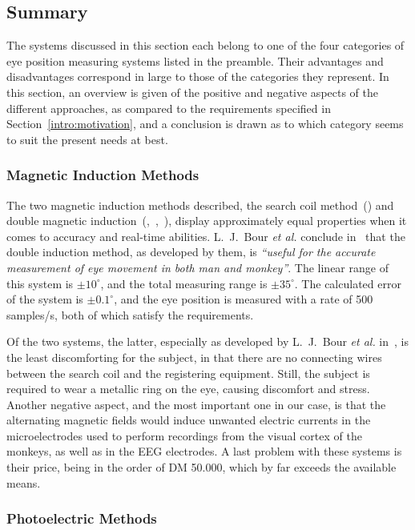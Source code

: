 \subsection{Summary}
\label{back:track:summary}

The systems discussed in this section each belong to one of the four
categories of eye position measuring systems listed in the preamble.
Their advantages and disadvantages correspond in large to those of the
categories they represent.  In this section, an overview is given of
the positive and negative aspects of the different approaches, as
compared to the requirements specified in
Section~\ref{intro:motivation}, and a conclusion is drawn as to which
category seems to suit the present needs at best.

\subsubsection{Magnetic Induction Methods}

The two magnetic induction methods described, the search coil
method~(\cite{robinson}) and double magnetic
induction~(\cite{allik},~\cite{reulen},~\cite{coil}), display
approximately equal properties when it comes to accuracy and real-time
abilities.  L.\ J.\ Bour {\em et al.\/} conclude in~\cite{coil} that
the double induction method, as developed by them, is {\em ``useful
  for the accurate measurement of eye movement in both man and
  monkey''\/}.  The linear range of this system is $\pm 10^{\circ}$,
and the total measuring range is $\pm 35^{\circ}$.  The calculated
error of the system is $\pm 0.1^{\circ}$, and the eye position is
measured with a rate of 500 samples/s, both of which satisfy the
requirements.

Of the two systems, the latter, especially as developed by L.\ J.\ 
Bour {\em et al.\/} in~\cite{coil}, is the least discomforting for the
subject, in that there are no connecting wires between the search coil
and the registering equipment.  Still, the subject is required to wear
a metallic ring on the eye, causing discomfort and stress.  Another
negative aspect, and the most important one in our case, is that the
alternating magnetic fields would induce unwanted electric currents in
the microelectrodes used to perform recordings from the visual cortex
of the monkeys, as well as in the EEG electrodes.  A last problem with
these systems is their price, being in the order of DM 50.000, which
by far exceeds the available means.

\subsubsection{Photoelectric Methods}

